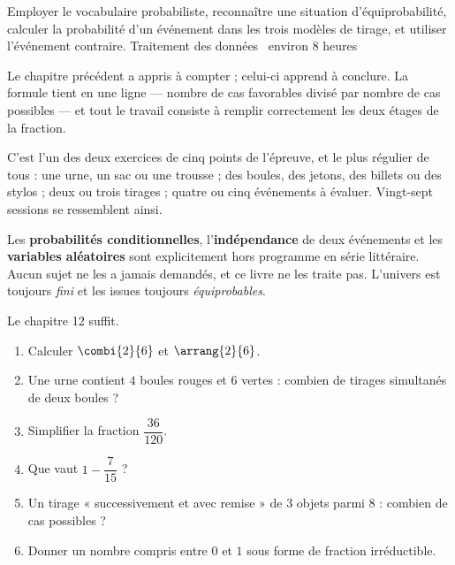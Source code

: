   {Employer le vocabulaire probabiliste, reconnaître une situation
   d'équiprobabilité, calculer la probabilité d'un événement dans les trois
   modèles de tirage, et utiliser l'événement contraire.}
  {Traitement des données \textbullet\ environ 8 heures}

Le chapitre précédent a appris à compter ; celui-ci apprend à conclure. La
formule tient en une ligne — nombre de cas favorables divisé par nombre de
cas possibles — et tout le travail consiste à remplir correctement les deux
étages de la fraction.

C'est l'un des deux exercices de cinq points de l'épreuve, et le plus
régulier de tous : une urne, un sac ou une trousse ; des boules, des jetons,
des billets ou des stylos ; deux ou trois tirages ; quatre ou cinq
événements à évaluer. Vingt-sept sessions se ressemblent ainsi.

\begin{remarque}
Les \textbf{probabilités conditionnelles}, l'\textbf{indépendance} de deux
événements et les \textbf{variables aléatoires} sont explicitement hors
programme en série littéraire. Aucun sujet ne les a jamais demandés, et ce
livre ne les traite pas. L'univers est toujours \emph{fini} et les issues
toujours \emph{équiprobables}.
\end{remarque}

\begin{revision}
Le chapitre 12 suffit.

\begin{enumerate}[label=\textbf{\arabic*.}, leftmargin=*, itemsep=0.35em]
  \item Calculer $\combi{2}{6}$ et $\arrang{2}{6}$.
  \item Une urne contient $4$ boules rouges et $6$ vertes : combien de
        tirages simultanés de deux boules ?
  \item Simplifier la fraction $\dfrac{36}{120}$.
  \item Que vaut $1-\dfrac{7}{15}$ ?
  \item Un tirage « successivement et avec remise » de $3$ objets parmi
        $8$ : combien de cas possibles ?
  \item Donner un nombre compris entre $0$ et $1$ sous forme de fraction
        irréductible.
\end{enumerate}
\end{revision}

